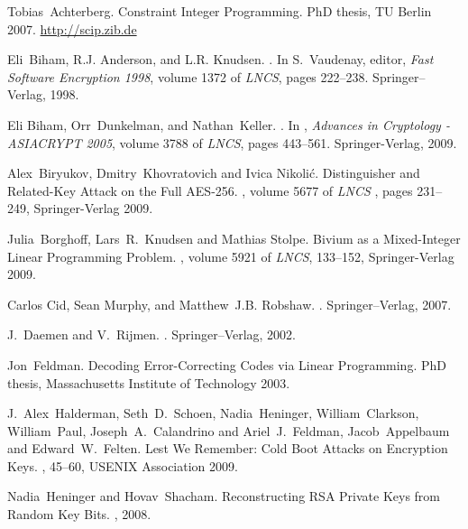 \documentclass{llncs}
\newcommand{\Serpent}{\textsc{Serpent}\xspace}
\begin{document}

\begin{thebibliography}{99}

Tobias~Achterberg.
\newblock Constraint Integer Programming.
\newblock PhD thesis, TU Berlin 2007. \url{http://scip.zib.de}

Eli~Biham, R.J. Anderson, and L.R. Knudsen.
\newblock {\Serpent: A New Block Cipher Proposal}.
\newblock In S.~Vaudenay, editor, {\em Fast Software Encryption 1998}, volume
  1372 of {\em LNCS}, pages 222--238. {Springer--Verlag}, 1998.

Eli Biham, Orr~Dunkelman, and Nathan~Keller.
.
\newblock In , {\em Advances in Cryptology - ASIACRYPT 2005}, volume 3788 of {\em LNCS}, pages 443--561. {Springer-Verlag}, 2009.

Alex~Biryukov, Dmitry~Khovratovich and Ivica Nikolić.
\newblock Distinguisher and Related-Key Attack on the Full AES-256.
, volume 5677 of {\em LNCS} , pages 231--249, Springer-Verlag 2009.

Julia~Borghoff, Lars~R.~Knudsen and Mathias Stolpe.
\newblock Bivium as a Mixed-Integer Linear Programming Problem.
, volume 5921 of {\em LNCS}, 133--152, Springer-Verlag 2009.

Carlos Cid, Sean Murphy, and Matthew~J.B. Robshaw.
.
\newblock Springer--Verlag, 2007.

J.~Daemen and V.~Rijmen.
.
\newblock Springer--Verlag, 2002.

Jon~Feldman.
\newblock Decoding Error-Correcting Codes via Linear Programming.
\newblock PhD thesis, Massachusetts Institute of Technology 2003.

J.~Alex~Halderman, Seth~D.~Schoen, Nadia~Heninger, William~Clarkson, William~Paul, Joseph~A.~Calandrino and Ariel~J.~Feldman, Jacob~Appelbaum and Edward~W.~Felten.
\newblock Lest We Remember: Cold Boot Attacks on Encryption Keys.
, 45--60, USENIX Association 2009.

Nadia~Heninger and Hovav~Shacham.
\newblock Reconstructing RSA Private Keys from Random Key Bits.
, 2008.


\end{thebibliography}
\end{document}
